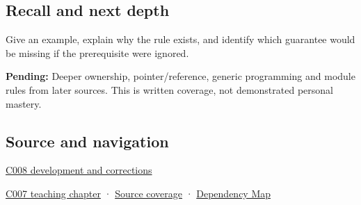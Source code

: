 \subsection{Recall and next depth}\label{appendix-3f7e15effba6-recall-and-next-depth}

Give an example, explain why the rule exists, and identify which guarantee would be missing if the prerequisite were ignored.

\textbf{Pending:} Deeper ownership, pointer/reference, generic programming and module rules from later sources. This is written coverage, not demonstrated personal mastery.

\subsection{Source and navigation}\label{appendix-3f7e15effba6-source-and-navigation}

\hyperref[appendix-fd090d982a15-m008---parts-113-126]{C008 development and corrections}

\hyperref[01-foundations-i-ch003-bringing-the-object-model-back-to-bytes]{C007 teaching chapter} · \hyperref[appendix-fd090d982a15-m007---parts-101-112]{Source coverage} · \hyperref[appendix-4ad47bdd269a]{Dependency Map}
